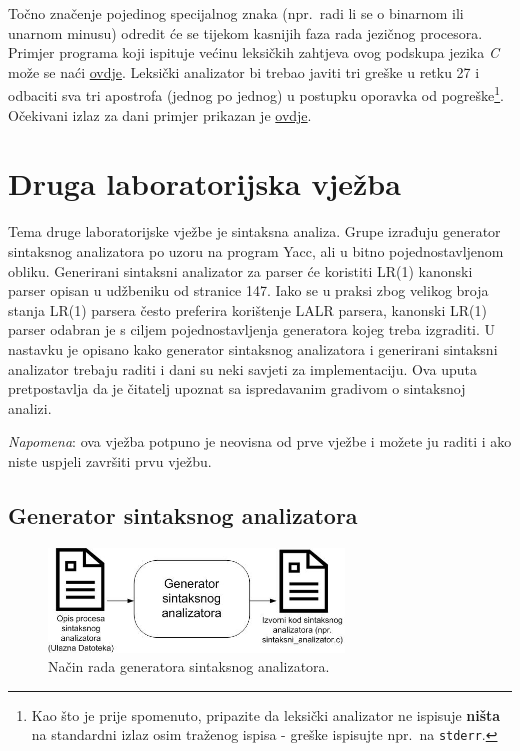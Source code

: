 \documentclass[times, 12pt, utf8]{book}
\begin{document}
Točno značenje pojedinog specijalnog znaka (npr.~radi li se o binarnom ili unarnom minusu) odredit će se tijekom kasnijih faza rada jezičnog procesora.
Primjer programa koji ispituje većinu leksičkih zahtjeva ovog podskupa jezika \emph{C} može se naći \href{https://github.com/fer-ppj/ppj-labosi/raw/master/res/lab1/primjer.simple}{ovdje}.
Leksički analizator bi trebao javiti tri greške u retku 27 i odbaciti sva tri apostrofa (jednog po jednog) u postupku oporavka od pogreške\footnote{Kao što je prije spomenuto, pripazite da leksički analizator ne ispisuje \textbf{ništa} na standardni izlaz osim traženog ispisa - greške ispisujte npr.~na \texttt{stderr}.}.
Očekivani izlaz za dani primjer prikazan je \href{https://github.com/fer-ppj/ppj-labosi/raw/master/res/lab1/simple_primjer_izlaz.txt}{ovdje}.




\chapter{Druga laboratorijska vježba}\label{chap:II}

Tema druge laboratorijske vježbe je sintaksna analiza.
Grupe izrađuju generator sintaksnog analizatora po uzoru na program Yacc, ali u bitno pojednostavljenom obliku.
Generirani sintaksni analizator za parser će koristiti LR(1) kanonski parser opisan u udžbeniku od stranice 147.
Iako se u praksi zbog velikog broja stanja LR(1) parsera često preferira korištenje LALR parsera, kanonski LR(1) parser odabran je s ciljem pojednostavljenja generatora kojeg treba izgraditi.
U nastavku je opisano kako generator sintaksnog analizatora i generirani sintaksni analizator trebaju raditi i dani su neki savjeti za implementaciju.
Ova uputa pretpostavlja da je čitatelj upoznat sa ispredavanim gradivom o sintaksnoj analizi.

\emph{Napomena}: ova vježba potpuno je neovisna od prve vježbe i možete ju raditi i ako niste uspjeli završiti prvu vježbu.

\section{Generator sintaksnog analizatora}

\begin{figure}[htb!]
\centering
\includegraphics[width=0.7\textwidth]{slike/generator-sintaksnog-analizatora.jpg}
\caption{Način rada generatora sintaksnog analizatora.}
\label{fig:generator-sintaksnog-analizatora}
\end{figure}
\end{document}

